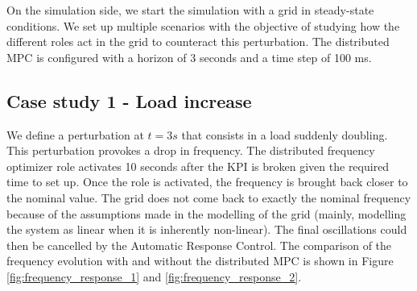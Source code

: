 \documentclass{article}
\begin{document}
On the simulation side, we start the simulation with a grid in steady-state conditions. We set up multiple scenarios with the objective of studying how the different roles act in the grid to counteract this perturbation. The distributed MPC is configured with a horizon of 3 seconds and a time step of 100 ms.

\subsection{Case study 1 - Load increase}

We define a perturbation at $t=3s$ that consists in a load suddenly doubling. This perturbation provokes a drop in frequency. The distributed frequency optimizer role activates 10 seconds after the KPI is broken given the required time to set up. Once the role is activated, the frequency is brought back closer to the nominal value. The grid does not come back to exactly the nominal frequency because of the assumptions made in the modelling of the grid (mainly, modelling the system as linear when it is inherently non-linear). The final oscillations could then be cancelled by the Automatic Response Control. The comparison of the frequency evolution with and without the distributed MPC is shown in Figure \ref{fig:frequency_response_1} and \ref{fig:frequency_response_2}.
\end{document}
